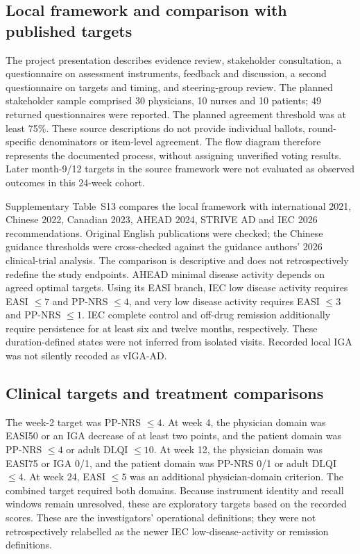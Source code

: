 \subsection{Local framework and comparison with published targets}
The project presentation describes evidence review, stakeholder consultation, a questionnaire on assessment instruments, feedback and discussion, a second questionnaire on targets and timing, and steering-group review. The planned stakeholder sample comprised 30 physicians, 10 nurses and 10 patients; 49 returned questionnaires were reported. The planned agreement threshold was at least 75\%. These source descriptions do not provide individual ballots, round-specific denominators or item-level agreement. The flow diagram therefore represents the documented process, without assigning unverified voting results. Later month-9/12 targets in the source framework were not evaluated as observed outcomes in this 24-week cohort.

Supplementary Table~S13 compares the local framework with international 2021, Chinese 2022, Canadian 2023, AHEAD 2024, STRIVE AD and IEC 2026 recommendations. Original English publications were checked; the Chinese guidance thresholds were cross-checked against the guidance authors' 2026 clinical-trial analysis.\citep{debruin2021t2t,zhao2022chinat2t,zhao2026t2t,yeung2023t2t,silverberg2024ahead,gkini2026strive,merola2026iec} The comparison is descriptive and does not retrospectively redefine the study endpoints. AHEAD minimal disease activity depends on agreed optimal targets. Using its EASI branch, IEC low disease activity requires EASI $\leq7$ and PP-NRS $\leq4$, and very low disease activity requires EASI $\leq3$ and PP-NRS $\leq1$. IEC complete control and off-drug remission additionally require persistence for at least six and twelve months, respectively. These duration-defined states were not inferred from isolated visits. Recorded local IGA was not silently recoded as vIGA-AD.

\subsection{Clinical targets and treatment comparisons}
The week-2 target was PP-NRS $\leq4$. At week 4, the physician domain was EASI50 or an IGA decrease of at least two points, and the patient domain was PP-NRS $\leq4$ or adult DLQI $\leq10$. At week 12, the physician domain was EASI75 or IGA 0/1, and the patient domain was PP-NRS 0/1 or adult DLQI $\leq4$. At week 24, EASI $\leq5$ was an additional physician-domain criterion. The combined target required both domains. Because instrument identity and recall windows remain unresolved, these are exploratory targets based on the recorded scores. These are the investigators' operational definitions; they were not retrospectively relabelled as the newer IEC low-disease-activity or remission definitions.\citep{merola2026iec}

